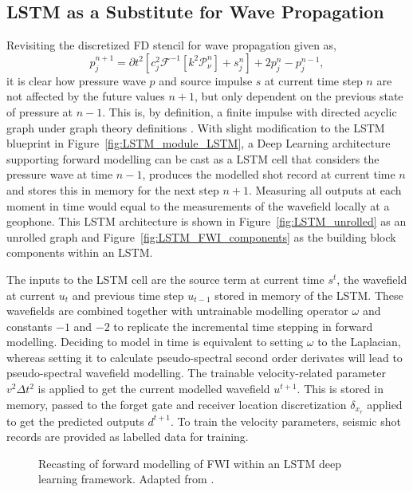 \subsection{LSTM as a Substitute for Wave Propagation}
Revisiting the discretized FD stencil for wave propagation given as,
\begin{equation}
	p_j^{n+1}=\partial t^2 \left[c_j^2 \mathcal{F}^{-1} \left[k^2 \mathcal{P}_{\nu}^n\right]+s_j^n\right]+2p_j^n-p_j^{n-1},
\end{equation}
it is clear how pressure wave $p$ and source impulse $s$ at current time step $n$ are not affected by the future values $n+1$, but only dependent on the previous state of pressure at $n-1$. This is, by definition, a finite impulse with directed acyclic graph under graph theory definitions \citep{Thulasiraman2011}. With slight modification to the LSTM blueprint in Figure~\ref{fig:LSTM_module_LSTM}, a Deep Learning architecture supporting forward modelling can be cast as a LSTM cell that considers the pressure wave at time $n-1$, produces the modelled shot record at current time $n$ and stores this in memory for the next step $n+1$. Measuring all outputs at each moment in time would equal to the measurements of the wavefield locally at a geophone. This LSTM architecture is shown in Figure~\ref{fig:LSTM_unrolled} as an unrolled graph and Figure~\ref{fig:LSTM_FWI_components} as the building block components within an LSTM. 

The inputs to the LSTM cell are the source term at current time $s^t$, the wavefield at current $u_t$ and previous time step $u_{t-1}$ stored in memory of the LSTM. These wavefields are combined together with untrainable modelling operator $\omega$ and constants $-1$ and $-2$ to replicate the incremental time stepping in forward modelling. Deciding to model in time is equivalent to setting $\omega$ to the Laplacian, whereas setting it to calculate pseudo-spectral second order derivates will lead to pseudo-spectral wavefield modelling. The trainable velocity-related parameter $v^2 \Delta t^2$ is applied to get the current modelled wavefield $u^{t+1}$. This is stored in memory, passed to the forget gate and receiver location discretization $\delta_{x_{r}}$ applied to get the predicted outputs $d^{t+1}$. To train the velocity parameters, seismic shot records are provided as labelled data for training.
\clearpage
\begin{figure}[!ht]
	\centering
	\caption[Recasting of forward modelling within an LSTM]{Recasting of forward modelling of FWI within an LSTM deep learning framework. Adapted from \cite{Sun2019}.}        
	\label{fig:LSTM_FWI}
\end{figure}

